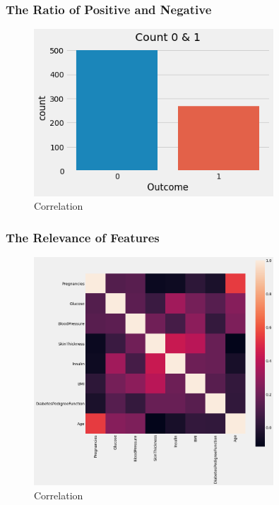 \documentclass[11pt,en]{elegantpaper}
\begin{document}
\subsubsection{The Ratio of Positive and Negative}
\begin{figure}[H]
    \centering
    \includegraphics[width=0.8\textwidth]{figure/f1.png}
    \caption{Correlation}
\end{figure}
\subsubsection{The Relevance of Features}
\begin{figure}[H]
    \centering
    \includegraphics[width=0.8\textwidth]{figure/relevance-data}
    \caption{Correlation}
\end{figure}
\end{document}

